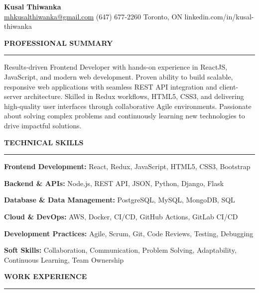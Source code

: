 \documentclass[10pt,letterpaper]{article}
\begin{document}
\begin{center}
{\LARGE\textbf{Kusal Thiwanka}}\\[3pt]
\href{mailto:mhkusalthiwanka@gmail.com}{mhkusalthiwanka@gmail.com}\hspace{2em}%
(647) 677{-}2260\hspace{2em}%
Toronto, ON\hspace{2em}
linkedin.com/in/kusal-thiwanka
\end{center}

\vspace{6pt}

\textbf{PROFESSIONAL SUMMARY}\\[-8pt]
\noindent\rule{\textwidth}{1pt}

\vspace{-2pt}

Results-driven Frontend Developer with hands-on experience in ReactJS, JavaScript, and modern web development. Proven ability to build scalable, responsive web applications with seamless REST API integration and client-server architecture. Skilled in Redux workflows, HTML5, CSS3, and delivering high-quality user interfaces through collaborative Agile environments. Passionate about solving complex problems and continuously learning new technologies to drive impactful solutions.

\vspace{8pt}

\textbf{TECHNICAL SKILLS}\\[-8pt]
\noindent\rule{\textwidth}{1pt}

\vspace{-2pt}

\textbf{Frontend Development:} React, Redux, JavaScript, HTML5, CSS3, Bootstrap

\textbf{Backend \& APIs:} Node.js, REST API, JSON, Python, Django, Flask

\textbf{Database \& Data Management:} PostgreSQL, MySQL, MongoDB, SQL

\textbf{Cloud \& DevOps:} AWS, Docker, CI/CD, GitHub Actions, GitLab CI/CD

\textbf{Development Practices:} Agile, Scrum, Git, Code Reviews, Testing, Debugging

\textbf{Soft Skills:} Collaboration, Communication, Problem Solving, Adaptability, Continuous Learning, Team Ownership

\vspace{8pt}

\textbf{WORK EXPERIENCE}\\[-8pt]
\noindent\rule{\textwidth}{1pt}
\end{document}
